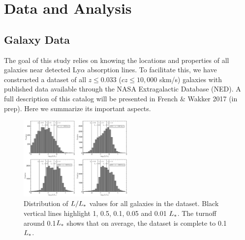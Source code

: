 \documentclass[iop]{emulateapj-rtx4}
\begin{document}
\section{Data and Analysis}

\subsection{Galaxy Data}

The goal of this study relies on knowing the locations and properties of all galaxies near detected Ly$\alpha$ absorption lines. To facilitate this, we have constructed a dataset of all $z\leq 0.033$ ($cz\leq 10,000$ skm/s) galaxies with published data available through the NASA Extragalactic Database (NED). A full description of this catalog will be presented in French $\&$ Wakker 2017 (in prep). Here we summarize its important aspects. 

\begin{figure}[ht!]
        \centering
        \vspace{0pt}
        \includegraphics[width=0.50\textwidth]{Lstar_histogram_4bins_final_0-10000.pdf}
        \caption{\small{Distribution of $L/L_{\**}$ values for all galaxies in the dataset. Black vertical lines highlight 1, 0.5, 0.1, 0.05 and 0.01 $L_{\**}$. The turnoff around 0.1$L_{\**}$ shows that on average, the dataset is complete to 0.1$L_{\**}$.}}
        \label{completeness}
\end{figure} 
\end{document}

